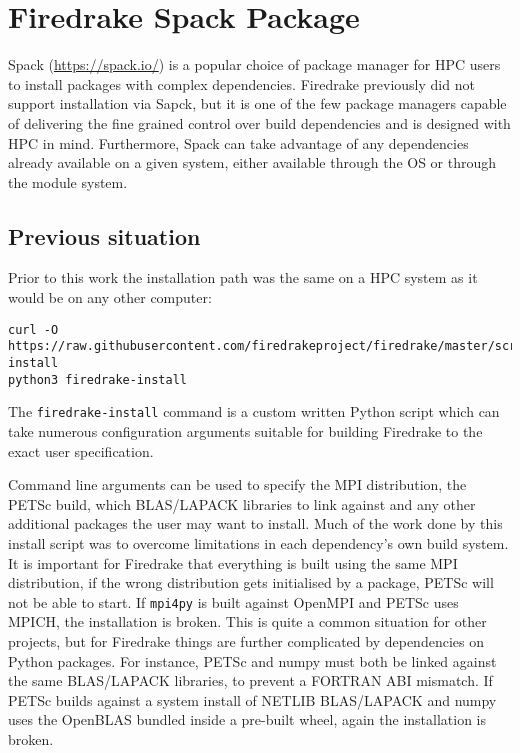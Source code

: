 \documentclass[a4paper,11pt]{article}
\begin{document}
\clearpage
\section{Firedrake Spack Package}
\label{sec:spack}
Spack (\url{https://spack.io/}) is a popular choice of package manager for HPC users to install packages with complex dependencies.
Firedrake previously did not support installation via Sapck, but it is one of the few package managers capable of delivering the fine grained control over build dependencies and is designed with HPC in mind.
Furthermore, Spack can take advantage of any dependencies already available on a given system, either available through the OS or through the module system.

\subsection{Previous situation}
\label{ssec:prev}
Prior to this work the installation path was the same on a HPC system as it would be on any other computer:
\begin{lstlisting}
curl -O https://raw.githubusercontent.com/firedrakeproject/firedrake/master/scripts/firedrake-install
python3 firedrake-install
\end{lstlisting}
The \verb`firedrake-install` command is a custom written Python script which can take numerous configuration arguments suitable for building Firedrake to the exact user specification.

Command line arguments can be used to specify the MPI distribution, the PETSc build, which BLAS/LAPACK libraries to link against and any other additional packages the user may want to install.
Much of the work done by this install script was to overcome limitations in each dependency's own build system.
It is important for Firedrake that everything is built using the same MPI distribution, if the wrong distribution gets initialised by a package, PETSc will not be able to start.
If \verb`mpi4py` is built against OpenMPI and PETSc uses MPICH, the installation is broken.
This is quite a common situation for other projects, but for Firedrake things are further complicated by dependencies on Python packages.
For instance, PETSc and numpy must both be linked against the same BLAS/LAPACK libraries, to prevent a FORTRAN ABI mismatch.
If PETSc builds against a system install of NETLIB BLAS/LAPACK and numpy uses the OpenBLAS bundled inside a pre-built wheel, again the installation is broken.
\end{document}

